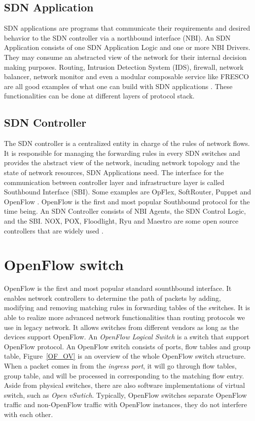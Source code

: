 \subsection{SDN Application}
\label{SDN Application}
SDN applications are programs that communicate their requirements and desired behavior to the SDN controller via a northbound interface (NBI). An SDN Application consists of one SDN Application Logic and one or more NBI Drivers. They may consume an abstracted view of the network for their internal decision making purposes. Routing, Intrusion Detection System (IDS), firewall, network balancer, network monitor and even a modular composable service like FRESCO are all good examples of what one can build with SDN applications \cite{FRESCO}. These functionalities can be done at different layers of protocol stack.

\subsection{SDN Controller}
\label{SDN Controller}
The SDN controller is a centralized entity in charge of the rules of network flows. It is responsible for managing the forwarding rules in every SDN switches and provides the abstract view of the network, incuding network topology and the state of network resources, SDN Applications need. The interface for the communication between controller layer and infrastructure layer is called Southbound Interface (SBI). Some examples are OpFlex, SoftRouter, Puppet and OpenFlow \cite{LNRSW04}. OpenFlow is the first and most popular Southbound protocol for the time being. An SDN Controller consists of NBI Agents, the SDN Control Logic, and the SBI. NOX, POX, Floodlight, Ryu and Maestro are some open source controllers that are widely used \cite{GKPPCMS08,MBF}.

\section{OpenFlow switch}
\label{OpenFlow switch}
OpenFlow is the first and most popular standard sounthbound interface. It enables network controllers to determine the path of packets by adding, modifying and removing matching rules in forwarding tables of the switches. It is able to realize more advanced network functionalities than routing protocols we use in legacy network. It allows switches from different vendors as long as the devices support OpenFlow. An \textit{OpenFlow Logical Switch} is a switch that support OpenFlow protocol. An OpenFlow switch consists of ports, flow tables and group table, Figure~\ref{OF_OV} is an overview of the whole OpenFlow switch structure. When a packet comes in from the \textit{ingress port}, it will go through flow tables, group table, and will be processed in corresponding to the matching flow entry. Aside from physical switches, there are also software implementations of virtual switch, such as \textit{Open vSwtich}. Typically, OpenFlow switches separate OpenFlow traffic and non-OpenFlow traffic with OpenFlow instances, they do not interfere with each other. \cite{HP_SPEC}

